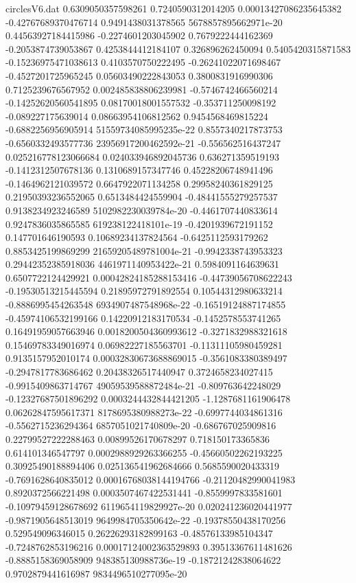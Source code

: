 \begin{filecontents}{circlesV6.dat}
0.6309050357598261	0.7240590312014205	0.00013427086235645382
-0.42767689370476714	0.9491438031378565	5678857895662971e-20
0.44563927184415986	-0.2274601203045902	0.7679222444162369
-0.2053874739053867	0.4253844412184107	0.326896262450094
0.5405420315871583	-0.15236975471038613	0.4103570750222495
-0.26241022071698467	-0.4527201725965245	0.05603490222843053
0.3800831916990306	0.7125239676567952	0.002485838806239981
-0.5746742466560214	-0.14252620560541895	0.08170018001557532
-0.353711250098192	-0.089227175639014	0.08663954106812562
0.9454568469815224	-0.6882256956905914	51559734085995235e-22
0.8557340217873753	-0.6560332493577736	23956917200462592e-21
-0.556562516437247	0.025216778123066684	0.024033946892045736
0.636271359519193	-0.1412312507678136	0.1310689157347746
0.45228206748941496	-0.1464962121039572	0.6647922071134258
0.29958240361829125	0.21950393236552065	0.6513484424559904
-0.48441555279257537	0.9138234923246589	5102982230039784e-20
-0.4461707440833614	0.9247836035865585	619238122418101e-19
-0.4201939672191152	0.147701646190593	0.10689234137824564
-0.6425112593179262	0.8853425199869299	21659205489781004e-21
-0.9942338743953323	0.29442352385918036	4461971140953422e-21
0.5984091164639631	0.6507722124429921	0.00042824185288153416
-0.44739056708622243	-0.19530513215445594	0.21895972791892554
0.10544312980633214	-0.8886995454263548	6934907487548968e-22
-0.16519124887174855	-0.45974106532199166	0.14220912183170534
-0.1452578553741265	0.16491959057663946	0.0018200504360993612
-0.3271832988321618	0.15469783349016974	0.06982227185563701
-0.11311105980459281	0.9135157952010174	0.00032830673688869015
-0.3561083380389497	-0.2947817783686462	0.20438326517440947
0.3724658234027415	-0.9915409863714767	49059539588872484e-21
-0.809763642248029	-0.12327687501896292	0.0003244432844421205
-1.1287681161906478	0.06262847595617371	8178695380988273e-22
-0.6997744034861316	-0.5562715236294364	6857051021740809e-20
-0.686767025909816	0.22799527222288463	0.00899526170678297
0.718150173365836	0.614101346547797	0.0002988929263366255
-0.45660502262193225	0.30925490188894406	0.025136541962684666
0.5685590020433319	-0.7691628640835012	0.00016768038144194766
-0.21120482990041983	0.8920372566221498	0.0003507467422531441
-0.8559997833581601	-0.10979459128678692	6119654119829927e-20
0.020241236020441977	-0.9871905648513019	9649984705350642e-22
-0.19378550438170256	0.529549096346015	0.26226293182899163
-0.48576133985104347	-0.7248762853196216	0.00017124002363529893
0.39513367611481626	-0.8885158369058909	948385130988736e-19
-0.18721242838064622	0.9702879441616987	9834496510277095e-20

\end{filecontents}
